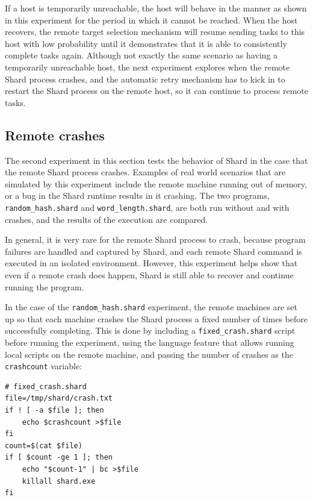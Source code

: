 \documentclass[oneside]{report}
\begin{document}
If a host is temporarily unreachable, the host will behave in the manner as shown in this experiment for the period in which it cannot be reached. When the host recovers, the remote target selection mechanism will resume sending tasks to this host with low probability until it demonstrates that it is able to consistently complete tasks again.
Although not exactly the same scenario as having a temporarily unreachable host, the next experiment explores when the remote Shard process crashes, and the automatic retry mechanism has to kick in to restart the Shard process on the remote host, so it can continue to process remote tasks.

\subsection{Remote crashes}
The second experiment in this section tests the behavior of Shard in the case that the remote Shard process crashes.
Examples of real world scenarios that are simulated by this experiment include the remote machine running out of memory, or a bug in the Shard runtime results in it crashing.
The two programs, \texttt{random\_hash.shard} and \texttt{word\_length.shard}, are both run without and with crashes, and the results of the execution are compared.

In general, it is very rare for the remote Shard process to crash, because program failures are handled and captured by Shard, and each remote Shard command is executed in an isolated environment.
However, this experiment helps show that even if a remote crash does happen, Shard is still able to recover and continue running the program.

In the case of the \texttt{random\_hash.shard} experiment, the remote machines are set up so that each machine crashes the Shard process a fixed number of times before successfully completing.
This is done by including a \texttt{fixed\_crash.shard} script before running the experiment, using the language feature that allows running local scripts on the remote machine, and passing the number of crashes as the \texttt{crashcount} variable:

\begin{minipage}[c]{\textwidth-15pt}
  \begin{lstlisting}[language=Shard]
# fixed_crash.shard
file=/tmp/shard/crash.txt
if ! [ -a $file ]; then
    echo $crashcount >$file
fi
count=$(cat $file)
if [ $count -ge 1 ]; then
    echo "$count-1" | bc >$file
    killall shard.exe
fi
\end{lstlisting}
  \smallskip
\end{minipage}
\end{document}

